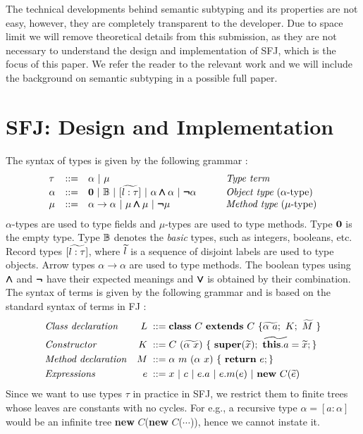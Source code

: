 \documentclass[runningheads]{llncs}
\begin{document}
The technical developments behind semantic subtyping and its properties are not easy, however, they are completely transparent to the developer.
Due to space limit we will remove theoretical details from this submission, as they are not necessary to understand the design and implementation of SFJ, which is the focus of this paper. We refer the reader to the relevant work \cite{Dardha2013,Dardha2017} and we will include the background on semantic subtyping in a possible full paper.


\section{SFJ: Design and Implementation}
\label{sec:design}
The syntax of types is given by the following grammar \cite{}:
$$
\begin{array}{llll}
\tau & ::= & \alpha \ |\ \mu
& \mbox{{\em Type term}}
\\
\alpha & ::=  & \zero \ |\ \btypes \ |\ [\wt{l:\tau}] \ |\ \alpha \synwedge \alpha \ |\ \synneg\alpha
\qquad
& \mbox{{\em Object type} ($\alpha $-type)}
\\
\mu & ::=  & \alpha \to \alpha \ |\ \mu \synwedge \mu \ |\ \synneg\mu
& \mbox{{\em Method type} ($\mu $-type)}
\end{array}
$$
$\alpha$-types are used to type fields and $\mu$-types are used to type methods.
Type $\mathbf{0}$ is the empty type.
Type ${\mathbb B}$ denotes the \emph{basic} types, such as integers, booleans, etc.
{Record} types $[\widetilde{l:\tau}]$, where $\widetilde{l}$ is a sequence of disjoint labels are used to type objects.
Arrow types $\alpha \to \alpha$ are used to type methods.
The boolean types using $\pmb{\wedge}$ and $\pmb{\neg}$ have their expected meanings and $\pmb{\vee}$ is obtained by their combination.\\
The syntax of terms is given by the following grammar and is based on the standard syntax of terms in FJ \cite{}:
\begin{align*}
& \mbox{\textit{Class declaration}} & L \; ::= \; & \syndecl{C}{C}{\wt{\alpha \ a};\ K; \ \wt{M}\ }\\
& \mbox{\textit{Constructor}} & K \;::=\; & C\ (\wt{\alpha\ x})\ \{\ \synsuper(\wt{x});\ \wt{\synthis.a}=\wt{x}; \}\\
& \mbox{\textit{Method declaration}} & M \; ::= \; & \alpha \ m\ (\alpha \ x)\ \{\ \synret e; \} \\
& \mbox{\textit{Expressions}} & e \; ::=\; & x\ |\  c\ |\ e.a\ |\ e.m(e) \ | \ \synnew C(\wt{e})
\end{align*}
Since we want to use types $\tau$ in practice in SFJ, we restrict them to finite trees whose leaves are constants with no cycles.
For e.g., a recursive type $\alpha = [a : \alpha]$ would be an infinite tree \textbf{new} $C$(\textbf{new} $C$($\cdots{}$)), hence we cannot instate it.
\end{document}
